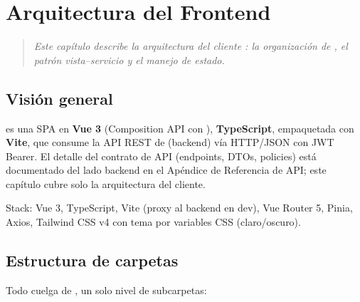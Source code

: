 \chapter{Arquitectura del Frontend}
\label{sec:frontend}

\begin{quote}
\itshape
Este capítulo describe la arquitectura del cliente : la organización de , el patrón vista--servicio y el manejo de estado.
\end{quote}

\section{Visión general}
\label{sec:frontend-vision-general}

 es una SPA en \textbf{Vue 3} (Composition API con ), \textbf{TypeScript}, empaquetada con \textbf{Vite}, que consume la API REST de  (backend) vía HTTP/JSON con JWT Bearer. El detalle del contrato de API (endpoints, DTOs, policies) está documentado del lado backend en el Apéndice de Referencia de API; este capítulo cubre solo la arquitectura del cliente.

Stack: Vue 3, TypeScript, Vite (proxy  al backend en dev), Vue Router 5, Pinia, Axios, Tailwind CSS v4 con tema por variables CSS (claro/oscuro).

\section{Estructura de carpetas}
\label{sec:frontend-estructura}

Todo cuelga de , un solo nivel de subcarpetas:

